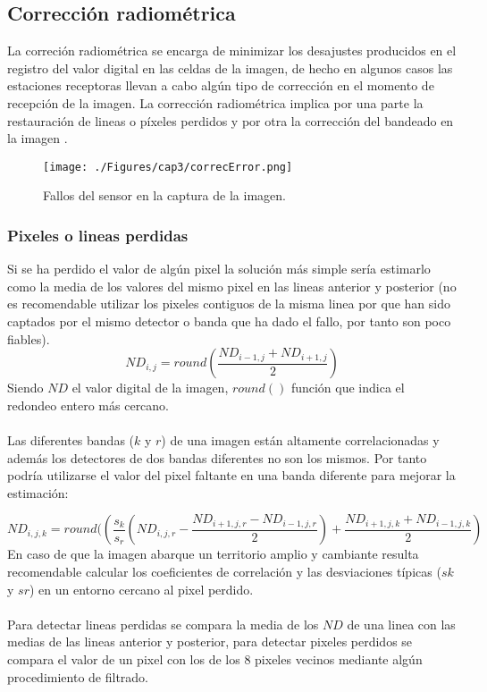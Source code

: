 \subsection{Correcci\'on radiom\'etrica}
La correci\'on radiom\'etrica se encarga de minimizar los desajustes producidos en el registro del valor digital en las celdas de la imagen, de hecho en algunos casos las estaciones receptoras llevan a cabo alg\'un tipo de correcci\'on en el momento de recepci\'on de la imagen. La corrección radiom\'etrica implica por una parte la restauraci\'on de lineas o p\'ixeles perdidos y por otra la correcci\'on del bandeado en la imagen \cite{teledUm}.
    \begin{figure}[H]
    	\centering
    	\texttt{[image: ./Figures/cap3/correcError.png]}
    	\caption{Fallos del sensor en la captura de la imagen.}
    	\label{fig:correcError}
    \end{figure}

\subsubsection{Pixeles o lineas perdidas}
Si se ha perdido el valor de alg\'un pixel la solución m\'as simple ser\'ia estimarlo como la media de los valores
del mismo pixel en las lineas anterior y posterior (no es recomendable utilizar los pixeles contiguos de la misma linea por que han sido captados por el mismo detector o banda que ha dado el fallo, por tanto son
poco fiables).
		\begin{equation}
		ND_{i,j} = round(\dfrac{ND_{i-1,j} + ND_{i+1,j}}{2})
		\end{equation} 
Siendo $ ND $ el valor digital de la imagen, $ round() $ funci\'on que indica el redondeo entero m\'as cercano.\\~\\
Las diferentes bandas ($ k $ y $ r $) de una imagen están altamente correlacionadas y adem\'as los detectores de dos bandas diferentes no son los mismos. Por tanto podría utilizarse el valor del pixel faltante en una banda diferente para mejorar la estimaci\'on:

		\begin{equation}
		ND_{i,j,k} = round((\dfrac{s_{k}}{s_{r}}(ND_{i,j,r}-\dfrac{ND_{i+1,j,r} - ND_{i-1,j,r}}{2}) + \dfrac{ND_{i+1,j,k} + ND_{i-1,j,k}}{2})
		\end{equation} 	
En caso de que la imagen abarque un territorio amplio y cambiante resulta recomendable calcular los coeficientes de correlaci\'on y las desviaciones t\'ipicas ($ sk $ y $ sr $) en un entorno cercano al pixel perdido.\\~\\
Para detectar lineas perdidas se compara la media de los $ ND $ de una linea con las medias de las lineas anterior y posterior, para detectar pixeles perdidos se compara el valor de un pixel con los de los 8 pixeles vecinos mediante alg\'un procedimiento de filtrado.

